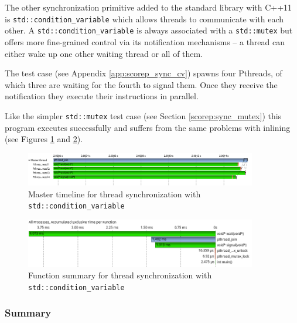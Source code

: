 The other synchronization primitive added to the standard library with C++11 is \texttt{std::condition\_variable} which allows threads to communicate with each other. A \texttt{std::condition\_variable} is always associated with a \texttt{std::mutex} but offers more fine-grained control via its notification mechanisms -- a thread can either wake up one other waiting thread or all of them.

The test case (see Appendix \ref{app:scorep_sync_cv}) spawns four Pthreads, of which three are waiting for the fourth to signal them. Once they receive the notification they execute their instructions in parallel.

Like the simpler \texttt{std::mutex} test case (see Section \ref{scorep:sync_mutex}) this program executes successfully and suffers from the same problems with inlining (see Figures \ref{scorep:sync_pthread_cv_timeline} and \ref{scorep:sync_pthread_cv_summary}).

\begin{figure}[htbp]
	\begin{center}
		\includegraphics[width=0.9\textwidth]{img/scorep_pthread_cv_timeline.png}
		\caption{Master timeline for thread synchronization with \texttt{std::condition\_variable}}
		\label{scorep:sync_pthread_cv_timeline}
	\end{center}
\end{figure}

\begin{figure}[htbp]
	\begin{center}
		\includegraphics[width=0.9\textwidth]{img/scorep_pthread_cv_summary.png}
		\caption{Function summary for thread synchronization with \texttt{std::condition\_variable}}
		\label{scorep:sync_pthread_cv_summary}
	\end{center}
\end{figure}

\subsubsection{Summary}

